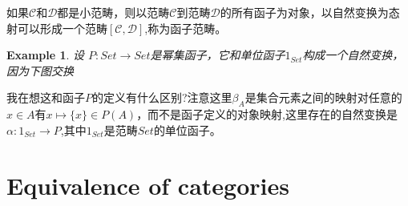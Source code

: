 \documentclass[UTF8,11pt,a4paper]{ctexart}
\newtheorem{example}[theorem]{Example}
\begin{document}
如果$\mathcal{C}$和$\mathcal{D}$都是小范畴，则以范畴$\mathcal{C}$到范畴$\mathcal{D}$的所有函子为对象，以自然变换为态射可以形成一个范畴$[\mathcal{C},\mathcal{D}]$,称为$\textbf{函子范畴}$。

\begin{example}
设 $P \colon Set \rightarrow Set $是幂集函子，它和单位函子$1_{Set}$构成一个自然变换，因为下图交换
\begin{center}
\end{center}
\end{example}
我在想这和函子$P$的定义有什么区别?注意这里$\beta_A$是集合元素之间的映射对任意的$x \in A$有$x \mapsto \{x\} \in P(A)$，而不是函子定义的对象映射,这里存在的自然变换是$\alpha \colon 1_{Set} \rightarrow P$,其中$1_{Set}$是范畴$Set$的单位函子。

\section{Equivalence of categories}
\end{document}
